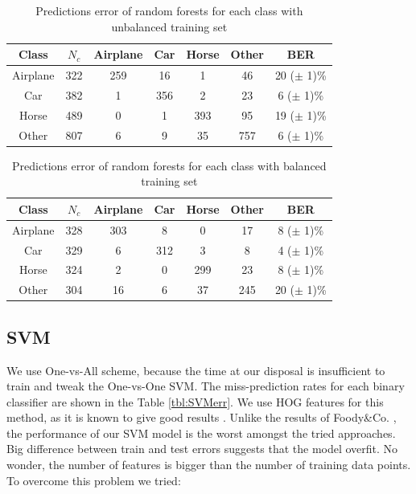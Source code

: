 \documentclass{article} %
\begin{document}
\begin{table}[!htb]
	\centering
		\begin{tabular}{|c|c|c|c|c|c|c|}
			\hline Class & $N_{c}$ & Airplane & Car & Horse & Other & BER \\ 
			\hline Airplane    & 322 & 259 & 16 & 1 & 46 & 20 ($\pm$ 1)\% \\ 
			\hline Car 			 & 382 & 1 & 356 & 2 & 23 & 6 ($\pm$ 1)\% \\ 
			\hline Horse       & 489 & 0 & 1 & 393 & 95 & 19 ($\pm$ 1)\% \\ 
			\hline Other       & 807 & 6 & 9 & 35 & 757 & 6 ($\pm$ 1)\% \\ 
			\hline 
		\end{tabular} 
		\caption{Predictions error of random forests for each class with unbalanced training set}
		\label{tbl:errClassNotBal}
\end{table}

\begin{table}
	\centering
	\begin{tabular}{|c|c|c|c|c|c|c|}
		\hline Class 		 & $N_{c}$ & Airplane & Car & Horse & Other & BER \\ 
		\hline Airplane 	& 328 & 303 & 8 & 0 & 17 & 8 ($\pm$ 1)\% \\ 
		\hline Car 			  & 329 & 6 & 312 & 3 & 8 & 4 ($\pm$ 1)\% \\ 
		\hline Horse		& 324 & 2 & 0 & 299 & 23 & 8 ($\pm$ 1)\% \\ 
		\hline Other 	    & 304 & 16 & 6 & 37 & 245 & 20 ($\pm$ 1)\% \\ 
		\hline 
	\end{tabular} 
	\caption{Predictions error of random forests for each class with balanced training set}
	\label{tbl:errClassBal}
\end{table}


\subsection{SVM}

We use One-vs-All scheme, because the time at our disposal is insufficient to train and tweak the One-vs-One SVM. The miss-prediction rates for each binary classifier are shown in the Table \ref{tbl:SVMerr}. We use HOG features for this method, as it is known to give good results \cite{zhang2010pedestrian}. Unlike the results of Foody\&Co. \cite{foody2004relative}, the performance of our SVM model is the worst amongst the tried approaches. Big difference between train and test errors suggests that the model overfit. No wonder, the number of features is bigger than the number of training data points. To overcome this problem we tried:
\end{document}
